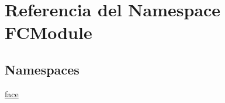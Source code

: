 \hypertarget{namespace_f_c_module}{}\section{Referencia del Namespace F\+C\+Module}
\label{namespace_f_c_module}
\subsection*{Namespaces}
\begin{DoxyCompactItemize}
\item 
 \mbox{\hyperlink{namespace_f_c_module_1_1face}{face}}
\end{DoxyCompactItemize}
